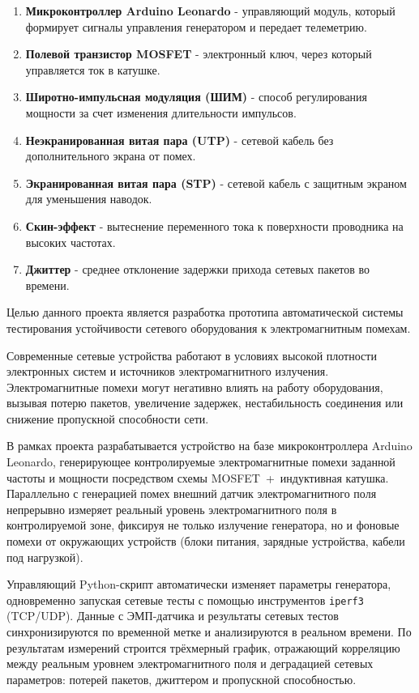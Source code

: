 \setcounter{page}{2}
\newpage
{}
\begin{enumerate}
  \item \textbf{Микроконтроллер Arduino Leonardo} - управляющий модуль, который формирует сигналы управления генератором и передает телеметрию.
  \item \textbf{Полевой транзистор MOSFET} - электронный ключ, через который управляется ток в катушке.
  \item \textbf{Широтно-импульсная модуляция (ШИМ)} - способ регулирования мощности за счет изменения длительности импульсов.
  \item \textbf{Неэкранированная витая пара (UTP)} - сетевой кабель без дополнительного экрана от помех.
  \item \textbf{Экранированная витая пара (STP)} - сетевой кабель с защитным экраном для уменьшения наводок.
  \item \textbf{Скин-эффект} - вытеснение переменного тока к поверхности проводника на высоких частотах.
  \item \textbf{Джиттер} - среднее отклонение задержки прихода сетевых пакетов во времени.
\end{enumerate}
\newpage
{}


Целью данного проекта является разработка прототипа автоматической
системы тестирования устойчивости сетевого оборудования к
электромагнитным помехам.

Современные сетевые устройства работают в условиях высокой плотности
электронных систем и источников электромагнитного излучения.
Электромагнитные помехи могут негативно влиять на работу оборудования,
вызывая потерю пакетов, увеличение задержек, нестабильность соединения
или снижение пропускной способности сети.

В рамках проекта разрабатывается устройство на базе микроконтроллера
Arduino Leonardo, генерирующее контролируемые электромагнитные помехи заданной
частоты и мощности посредством схемы
MOSFET~+~индуктивная катушка. Параллельно с генерацией помех
внешний датчик электромагнитного поля непрерывно измеряет реальный уровень
электромагнитного поля в контролируемой зоне,
фиксируя не только излучение генератора,
но и фоновые помехи от окружающих устройств
(блоки питания, зарядные устройства, кабели под нагрузкой).

Управляющий Python-скрипт автоматически изменяет параметры генератора,
одновременно запуская сетевые тесты с помощью инструментов
\texttt{iperf3} (TCP/UDP).
Данные с ЭМП-датчика и результаты сетевых тестов
синхронизируются по временной метке и анализируются в реальном времени.
По результатам измерений строится трёхмерный график,
отражающий корреляцию между реальным уровнем электромагнитного поля
и деградацией сетевых параметров: потерей пакетов, джиттером
и пропускной способностью.

